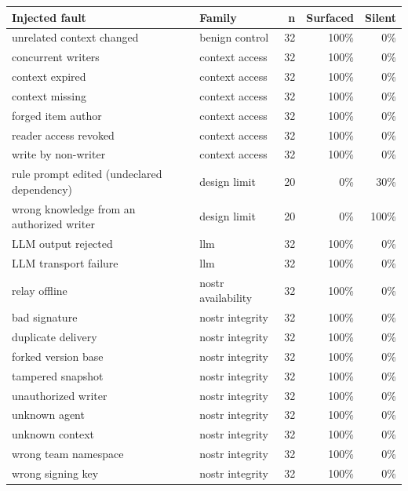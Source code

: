 \begin{tabular}{@{}llrrr@{}}
\toprule
Injected fault & Family & n & Surfaced & Silent \\
\midrule
unrelated context changed & benign control & 32 & 100\% & 0\% \\
concurrent writers & context access & 32 & 100\% & 0\% \\
context expired & context access & 32 & 100\% & 0\% \\
context missing & context access & 32 & 100\% & 0\% \\
forged item author & context access & 32 & 100\% & 0\% \\
reader access revoked & context access & 32 & 100\% & 0\% \\
write by non-writer & context access & 32 & 100\% & 0\% \\
rule prompt edited (undeclared dependency) & design limit & 20 & 0\% & 30\% \\
wrong knowledge from an authorized writer & design limit & 20 & 0\% & 100\% \\
LLM output rejected & llm & 32 & 100\% & 0\% \\
LLM transport failure & llm & 32 & 100\% & 0\% \\
relay offline & nostr availability & 32 & 100\% & 0\% \\
bad signature & nostr integrity & 32 & 100\% & 0\% \\
duplicate delivery & nostr integrity & 32 & 100\% & 0\% \\
forked version base & nostr integrity & 32 & 100\% & 0\% \\
tampered snapshot & nostr integrity & 32 & 100\% & 0\% \\
unauthorized writer & nostr integrity & 32 & 100\% & 0\% \\
unknown agent & nostr integrity & 32 & 100\% & 0\% \\
unknown context & nostr integrity & 32 & 100\% & 0\% \\
wrong team namespace & nostr integrity & 32 & 100\% & 0\% \\
wrong signing key & nostr integrity & 32 & 100\% & 0\% \\
\bottomrule
\end{tabular}
